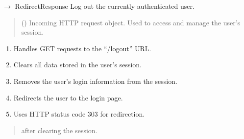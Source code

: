 \documentclass[letterpaper,10pt,english]{sphinxmanual}
\begin{document}

\begin{fulllineitems}
\label{\detokenize{modules:app.auth.logout}}
\pysigstartsignatures
\pysiglinewithargsret
{}
{}
{{ $\rightarrow$ RedirectResponse}}
\pysigstopsignatures
\sphinxAtStartPar
Log out the currently authenticated user.
\begin{quote}\begin{description}
\sphinxAtStartPar
{} () \textendash{} Incoming HTTP request object.
Used to access and manage the user’s session.

\end{description}\end{quote}
\begin{description}
\begin{enumerate}
%
\item {} 
\sphinxAtStartPar
Handles GET requests to the “/logout” URL.

\item {} 
\sphinxAtStartPar
Clears all data stored in the user’s session.

\item {} 
\sphinxAtStartPar
Removes the user’s login information from the session.

\item {} 
\sphinxAtStartPar
Redirects the user to the login page.

\item {} 
\sphinxAtStartPar
Uses HTTP status code 303 for redirection.

\end{enumerate}

\end{description}
\begin{quote}\begin{description}
\sphinxAtStartPar
\begin{description}
\sphinxAtStartPar
after clearing the session.

\end{description}



\end{description}
\end{quote}
\end{fulllineitems}
\end{document}
